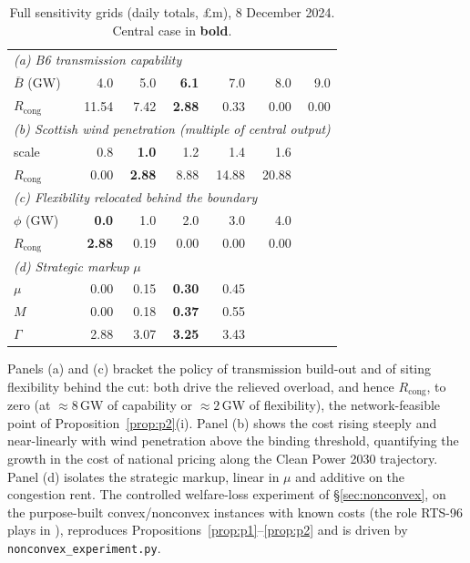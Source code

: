 \documentclass[review,3p,times]{elsarticle}
\theoremstyle{plain}
\theoremstyle{definition}
\begin{document}
\begin{table}[h]
\centering
\caption{Full sensitivity grids (daily totals, \pounds m), 8 December 2024.
Central case in \textbf{bold}.}
\label{tab:sensfull}
\small
\begin{tabular}{lrrrrrr}
\toprule
\multicolumn{7}{l}{\emph{(a) B6 transmission capability}}\\
$\overline B$ (GW) & 4.0 & 5.0 & \textbf{6.1} & 7.0 & 8.0 & 9.0\\
$R_{\mathrm{cong}}$ & 11.54 & 7.42 & \textbf{2.88} & 0.33 & 0.00 & 0.00\\
\midrule
\multicolumn{7}{l}{\emph{(b) Scottish wind penetration (multiple of central output)}}\\
scale & 0.8 & \textbf{1.0} & 1.2 & 1.4 & 1.6 & \\
$R_{\mathrm{cong}}$ & 0.00 & \textbf{2.88} & 8.88 & 14.88 & 20.88 & \\
\midrule
\multicolumn{7}{l}{\emph{(c) Flexibility relocated behind the boundary}}\\
$\phi$ (GW) & \textbf{0.0} & 1.0 & 2.0 & 3.0 & 4.0 & \\
$R_{\mathrm{cong}}$ & \textbf{2.88} & 0.19 & 0.00 & 0.00 & 0.00 & \\
\midrule
\multicolumn{7}{l}{\emph{(d) Strategic markup} $\mu$}\\
$\mu$ & 0.00 & 0.15 & \textbf{0.30} & 0.45 & & \\
$M$ & 0.00 & 0.18 & \textbf{0.37} & 0.55 & & \\
$\Gamma$ & 2.88 & 3.07 & \textbf{3.25} & 3.43 & & \\
\bottomrule
\end{tabular}
\end{table}

Panels (a) and (c) bracket the policy of transmission build-out and of siting
flexibility behind the cut: both drive the relieved overload, and hence
$R_{\mathrm{cong}}$, to zero (at $\approx8$\,GW of capability or $\approx2$\,GW of
flexibility), the network-feasible point of Proposition~\ref{prop:p2}(i). Panel
(b) shows the cost rising steeply and near-linearly with wind penetration above
the binding threshold, quantifying the growth in the cost of national pricing
along the Clean Power 2030 trajectory. Panel (d) isolates the strategic markup,
linear in $\mu$ and additive on the congestion rent. The controlled
welfare-loss experiment of \S\ref{sec:nonconvex}, on the purpose-built
convex/nonconvex instances with known costs (the role RTS-96 plays in
\citet{bichler2022}), reproduces Propositions~\ref{prop:p1}--\ref{prop:p2} and is
driven by \texttt{nonconvex\_experiment.py}.
\end{document}
